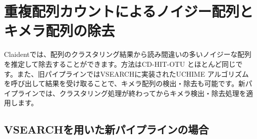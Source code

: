 \documentclass[titlepage,10pt,a4paper]{jsbook}
\begin{document}
\section{重複配列カウントによるノイジー配列とキメラ配列の除去}

Claidentでは、配列のクラスタリング結果から読み間違いの多いノイジーな配列を推定して除去することができます。方法はCD-HIT-OTU \citep{Li2012}とほとんど同じです。また、旧パイプラインではVSEARCHに実装されたUCHIME \citep{Edgar2011}アルゴリズムを呼び出して結果を受け取ることで、キメラ配列の検出・除去も可能です。新パイプラインでは、クラスタリング処理が終わってからキメラ検出・除去処理を適用します。

\subsection{VSEARCHを用いた新パイプラインの場合}
\end{document}
